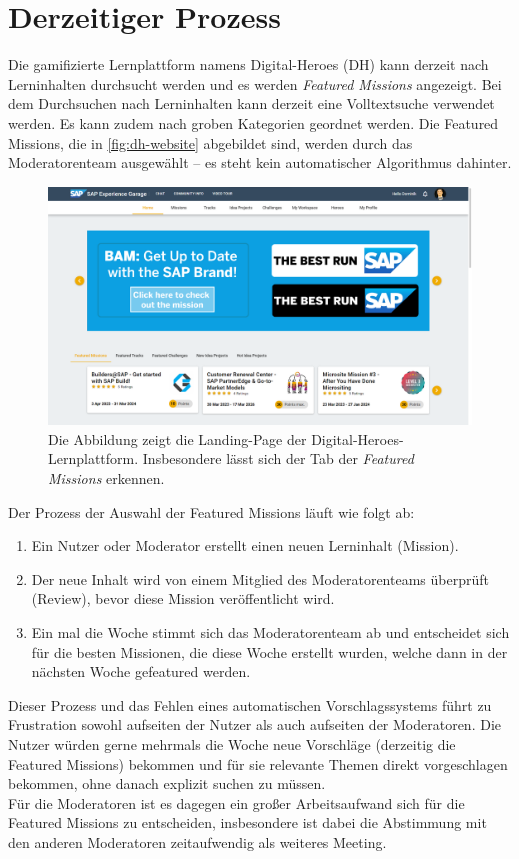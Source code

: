 \chapter{Derzeitiger Prozess}

Die gamifizierte Lernplattform namens Digital-Heroes (DH) kann derzeit nach Lerninhalten durchsucht werden 
und es werden \textit{Featured Missions} angezeigt.
Bei dem Durchsuchen nach Lerninhalten kann derzeit eine Volltextsuche verwendet werden. 
Es kann zudem nach groben Kategorien geordnet werden. 
Die Featured Missions, die in \autoref{fig:dh-website} abgebildet sind, 
werden durch das Moderatorenteam ausgewählt -- es steht kein automatischer 
Algorithmus dahinter.

\begin{figure}
	\centering
	\includegraphics[width=1.\textwidth]{Bilder/dh-website.png} 
	\caption{Die Abbildung zeigt die Landing-Page der Digital-Heroes-Lernplattform. 
    Insbesondere lässt sich der Tab der \textit{Featured Missions} erkennen.}
	\label{fig:dh-website}
\end{figure} 

Der Prozess der Auswahl der Featured Missions läuft wie folgt ab: 
\begin{enumerate}
    \item Ein Nutzer oder Moderator erstellt einen neuen Lerninhalt (Mission).
    \item Der neue Inhalt wird von einem Mitglied des Moderatorenteams überprüft (Review), 
    bevor diese Mission veröffentlicht wird.
    \item Ein mal die Woche stimmt sich das Moderatorenteam ab und entscheidet 
    sich für die besten Missionen, die diese Woche erstellt wurden, welche 
    dann in der nächsten Woche gefeatured werden. 
\end{enumerate}
Dieser Prozess und das Fehlen eines automatischen Vorschlagssystems führt 
zu Frustration sowohl aufseiten der Nutzer als auch aufseiten der Moderatoren. 
Die Nutzer würden gerne mehrmals die Woche neue Vorschläge 
(derzeitig die Featured Missions) bekommen und für sie relevante 
Themen direkt vorgeschlagen bekommen, ohne danach explizit suchen zu müssen. \\
Für die Moderatoren ist es dagegen ein großer Arbeitsaufwand 
sich für die Featured Missions zu entscheiden, insbesondere 
ist dabei die Abstimmung mit den anderen Moderatoren zeitaufwendig 
als weiteres Meeting. 

